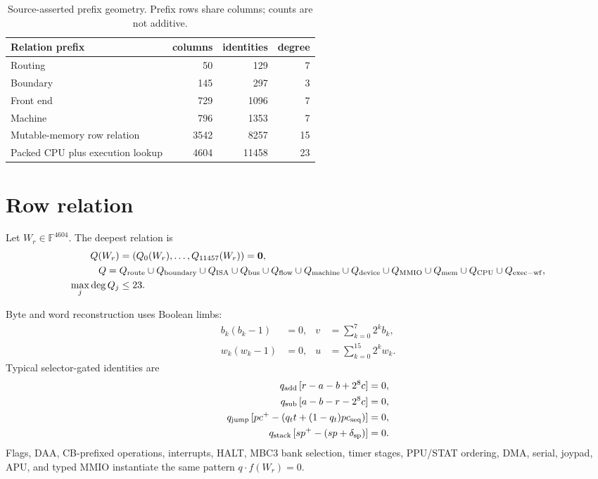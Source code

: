 \documentclass[10pt]{article}
\numberwithin{equation}{section}
\newcommand{\F}{\mathbb{F}}
\newcommand{\zero}{\mathbf{0}}
\begin{document}
\begin{table}[t]
\centering
\small
\begin{tabular}{@{}lrrr@{}}
\toprule
Relation prefix & columns & identities & degree \\
\midrule
Routing & 50 & 129 & 7 \\
Boundary & 145 & 297 & 3 \\
Front end & 729 & 1096 & 7 \\
Machine & 796 & 1353 & 7 \\
Mutable-memory row relation & 3542 & 8257 & 15 \\
Packed CPU plus execution lookup & 4604 & 11458 & 23 \\
\bottomrule
\end{tabular}
\caption{Source-asserted prefix geometry.  Prefix rows share columns; counts are not additive.}
\label{tab:geometry}
\end{table}

\section{Row relation}

Let $W_r\in\F^{4604}$.  The deepest relation is
\begin{align}
 Q(W_r)&=(Q_0(W_r),\ldots,Q_{11457}(W_r))=\zero,\\
 Q={}&Q_{\rm route}\cup Q_{\rm boundary}\cup Q_{\rm ISA}\cup Q_{\rm bus}
 \cup Q_{\rm flow}\cup Q_{\rm machine}\cup Q_{\rm device}\cup Q_{\rm MMIO}
 \cup Q_{\rm mem}\cup Q_{\rm CPU}\cup Q_{\rm exec-wf},\\
 \max_j\deg Q_j&\le23.
 \label{eq:deep-relation}
\end{align}

Byte and word reconstruction uses Boolean limbs:
\begin{align}
 b_k(b_k-1)&=0,&v&=\sum_{k=0}^{7}2^k b_k,\\
 w_k(w_k-1)&=0,&u&=\sum_{k=0}^{15}2^k w_k.
\end{align}
Typical selector-gated identities are
\begin{align}
 q_{\rm add}\,[r-a-b+2^8c]&=0,\\
 q_{\rm sub}\,[a-b-r-2^8c]&=0,\\
 q_{\rm jump}\,[pc^+-(q_t t+(1-q_t)pc_{\rm seq})]&=0,\\
 q_{\rm stack}\,[sp^+-(sp+\delta_{\rm sp})]&=0.
 \label{eq:cpu-families}
\end{align}
Flags, DAA, CB-prefixed operations, interrupts, HALT, MBC3 bank selection, timer stages,
PPU/STAT ordering, DMA, serial, joypad, APU, and typed MMIO instantiate the same pattern
$q\cdot f(W_r)=0$.
\end{document}
